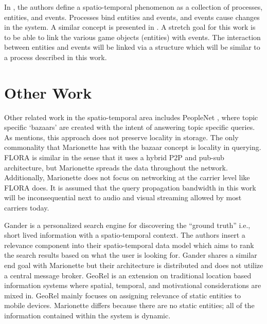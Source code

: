\documentclass[12pt]{report}	%
\theoremstyle{definition}
\theoremstyle{remark}
\begin{document}
In \cite{wang2005event}, the authors define a
spatio-temporal phenomenon as a collection of processes, entities, and
events. Processes bind entities and events, and events cause changes in the
system. A similar concept is presented in
\cite{chen1998event}. A stretch goal for this work is
to be able to link the various game objects (entities) with events. The
interaction between entities and events will be linked via a structure
which will be similar to a process described in this work.

\section{Other Work}

Other related work in the spatio-temporal area includes PeopleNet
\cite{motani2005peoplenet}, where topic specific
`bazaars' are created with the intent of answering topic specific
queries. As \cite{zio2011p2p} mentions, this approach
does not preserve locality in storage. The only commonality that
Marionette has with the bazaar concept is locality in querying. FLORA
\cite{kokku2008enabling} is similar in the sense that
it uses a hybrid P2P and pub-sub architecture, but Marionette spreads the
data throughout the network. Additionally, Marionette does not focus on
networking at the carrier level like FLORA does. It is assumed that the
query propagation bandwidth in this work will be inconsequential next to
audio and visual streaming allowed by most carriers today.

Gander \cite{michel2011gander} is a personalized search
engine for discovering the ``ground truth'' i.e., short lived information
with a spatio-temporal context. The authors insert a relevance component
into their spatio-temporal data model which aims to rank the search
results based on what the user is looking for. Gander shares a similar
end goal with Marionette but their architecture is distributed and does
not utilize a central message broker. GeoRel
\cite{reichenbacher2009geo} is an extension on
traditional location based information systems where spatial, temporal,
and motivational considerations are mixed in. GeoRel mainly focuses on
assigning relevance of static entities to mobile devices. Marionette
differs because there are no static entities; all of the information
contained within the system is dynamic.
\end{document}
